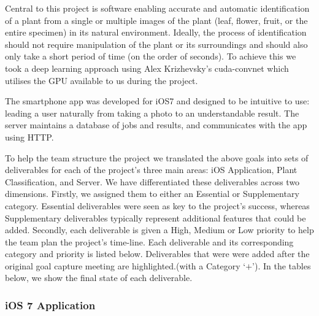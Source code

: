 \documentclass[a4paper,11pt]{article}
\begin{document}
Central to this project is software enabling accurate and automatic identification of a plant from a single or multiple images of the plant (leaf, flower, fruit, or the entire specimen) in its natural environment.  Ideally, the process of identification should not require manipulation of the plant or its surroundings and should also only take a short period of time (on the order of seconds). To achieve this we took a deep learning approach using Alex Krizhevsky's cuda-convnet which utilises the GPU available to us during the project.

The smartphone app was developed for iOS7 and designed to be intuitive to use: leading a user naturally from taking a photo to an understandable result. The server maintains a database of jobs and results, and communicates with the app using HTTP.

To help the team structure the project we translated the above goals into sets of deliverables for each of the project's three main areas: iOS Application, Plant Classification, and Server. We have differentiated these deliverables across two dimensions. Firstly, we assigned them to either an Essential or Supplementary category. Essential deliverables were seen as key to the project's success, whereas Supplementary deliverables typically represent additional features that could be added. Secondly, each deliverable is given a High, Medium or Low priority to help the team plan the project's time-line. Each deliverable and its corresponding category and priority is listed below. Deliverables that were were added after the original goal capture meeting are highlighted.(with a Category `$+$'). In the tables below, we show the final state of each deliverable.\\

\subsubsection{iOS 7 Application}
\end{document}
